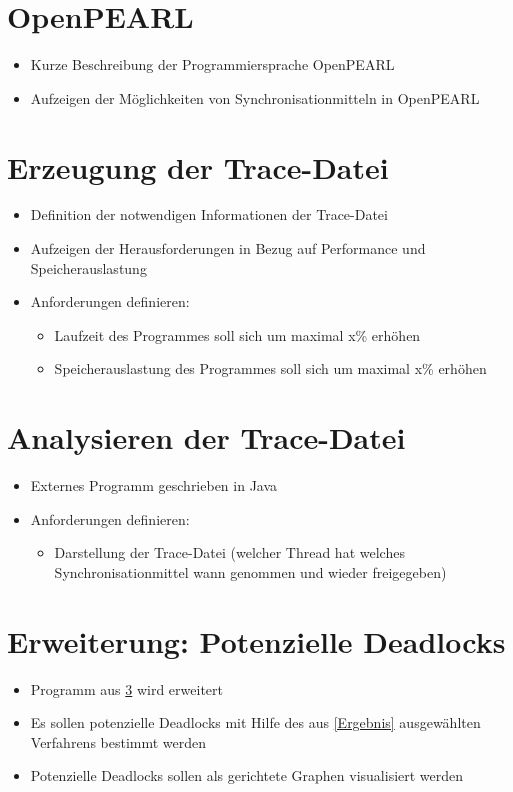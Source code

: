 \section{OpenPEARL}
\begin{itemize}
    \item Kurze Beschreibung der Programmiersprache OpenPEARL
    \item Aufzeigen der Möglichkeiten von Synchronisationmitteln in OpenPEARL
\end{itemize}

\section{Erzeugung der Trace-Datei}
\begin{itemize}
    \item Definition der notwendigen Informationen der Trace-Datei
    \item Aufzeigen der Herausforderungen in Bezug auf Performance und
    Speicherauslastung
  \item Anforderungen definieren:
  \begin{itemize}
    \item Laufzeit des Programmes soll sich um maximal x\% erhöhen
    \item Speicherauslastung des Programmes soll sich um maximal x\% erhöhen
  \end{itemize}
\end{itemize}

\section{Analysieren der Trace-Datei}\label{Analysieren der Trace-Datei}
\begin{itemize}
  \item Externes Programm geschrieben in Java
  \item Anforderungen definieren:
  \begin{itemize}
    \item Darstellung der Trace-Datei (welcher Thread hat welches
    Synchronisationmittel wann genommen und wieder freigegeben) 
  \end{itemize}
\end{itemize}

\section{Erweiterung: Potenzielle Deadlocks}
\begin{itemize}
  \item Programm aus \cref{Analysieren der Trace-Datei} wird erweitert
  \item Es sollen potenzielle Deadlocks mit Hilfe des aus \cref{Ergebnis}
  ausgewählten Verfahrens bestimmt werden
  \item Potenzielle Deadlocks sollen als gerichtete Graphen visualisiert werden
\end{itemize}